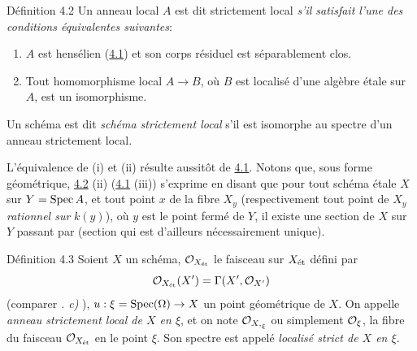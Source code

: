 \documentclass[10pt]{../fichiers-configuration-latex/smfart}
\begin{document}
\begin{enonce*}{Définition 4.2}
Un anneau local $A$ est dit strictement local \emph{s'il satisfait
  l'une des conditions équivalentes suivantes}:
\begin{enumerate}
\renewcommand{\theenumi}{\roman{enumi}}
\renewcommand{\labelenumi}{(\theenumi)}
\item $A$ est hensélien (\hyperref[VIII.subsec4.1]{4.1})
et son corps résiduel est séparablement clos.

\item Tout homomorphisme local $A \to B$, où $B$ est localisé d'une
  algèbre étale sur $A$, est un isomorphisme.
\end{enumerate}

Un schéma est dit \emph{schéma strictement local} s'il est isomorphe au
spectre d'un anneau strictement local.
\end{enonce*}

L'équivalence de (i) et (ii) résulte aussitôt de \hyperref[VIII.subsec4.1]{4.1}.
Notons que, sous
forme géométrique, \hyperref[VIII.def4.2]{4.2} (ii) (\resp \hyperref[VIII.subsec4.1]{4.1} (iii))
s'exprime en disant que
pour tout schéma étale $X$ sur $Y = \operatorname{Spec} A$, et tout point $x$ de la
fibre $X_y$ (respectivement tout point de $X_y$ \emph{rationnel sur}
$k(y)$), où $y$ est le point fermé de $Y$, il existe une section de $X$
sur $Y$ passant par  (section qui est d'ailleurs nécessairement
unique).

\begin{enonce*}{Définition 4.3}
Soient $X$ un schéma, ${\mathcal O}_{X_{\text{\rm ét}}}$ le faisceau sur
$X_{\text{\rm ét}}$ défini
par
$$
{\mathcal O}_{X_{\text{\rm ét}}} (X') = \Gamma (X', {\mathcal O}_{X'})
$$
(comparer \emph{. c)} ), $u : \xi = \Spec (\Omega) \to X$ un point
géométrique de $X$. On appelle \emph{anneau strictement local de $X$ en
$\xi$}, et on note ${\mathcal O}_{{X,}_{\xi}}$ ou simplement\pageoriginale
${\mathcal O}_{\xi}$, la fibre du faisceau ${\mathcal O}_{X_{\text{\rm ét}}}$ en le
point $\xi$. Son spectre est
appelé \emph{localisé strict de $X$ en $\xi$}.
\end{enonce*}
\end{document}
